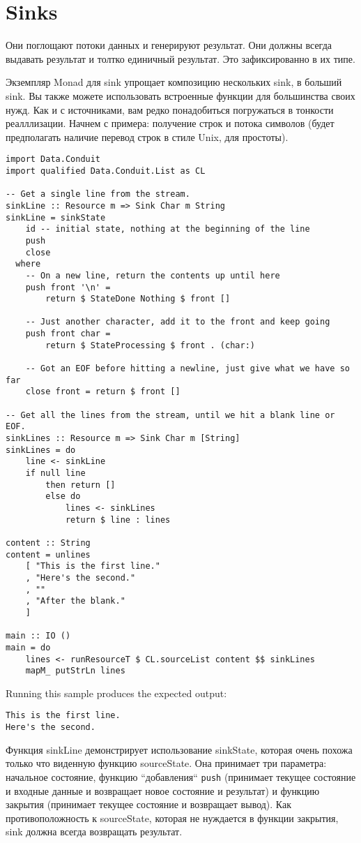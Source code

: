 \section{Sinks}

Они поглощают потоки данных и генерируют результат. Они должны всегда выдавать результат
и толтко единичный результат. Это зафиксированно в их типе.

Экземпляр Monad для sink упрощает композицию нескольких sink, в больший sink. Вы также
можете использовать встроенные функции для большинства своих нужд. Как и с источниками,
вам редко понадобиться погружаться в тонкости реалллизации. Начнем с примера:
получение строк и потока символов (будет предполагать наличие перевод строк в стиле Unix,
для простоты).

\begin{lstlisting}
import Data.Conduit
import qualified Data.Conduit.List as CL

-- Get a single line from the stream.
sinkLine :: Resource m => Sink Char m String
sinkLine = sinkState
    id -- initial state, nothing at the beginning of the line
    push
    close
  where
    -- On a new line, return the contents up until here
    push front '\n' =
        return $ StateDone Nothing $ front []

    -- Just another character, add it to the front and keep going
    push front char =
        return $ StateProcessing $ front . (char:)

    -- Got an EOF before hitting a newline, just give what we have so far
    close front = return $ front []

-- Get all the lines from the stream, until we hit a blank line or EOF.
sinkLines :: Resource m => Sink Char m [String]
sinkLines = do
    line <- sinkLine
    if null line
        then return []
        else do
            lines <- sinkLines
            return $ line : lines

content :: String
content = unlines
    [ "This is the first line."
    , "Here's the second."
    , ""
    , "After the blank."
    ]

main :: IO ()
main = do
    lines <- runResourceT $ CL.sourceList content $$ sinkLines
    mapM_ putStrLn lines
\end{lstlisting}
Running this sample produces the expected output:
\begin{verbatim}
This is the first line.
Here's the second.
\end{verbatim}
 
 
Функция sinkLine демонстрирует использование sinkState, которая очень похожа только что
виденную функцию sourceState. Она принимает три параметра: начальное состояние,
функцию ``добавления`` \verb=push= 
(принимает текущее состояние и входные данные и возвращает новое состояние и результат)
и функцию закрытия (принимает текущее состояние и возвращает вывод). Как
противоположность к sourceState, которая не нуждается в функции закрытия, sink должна
всегда возвращать результат.

